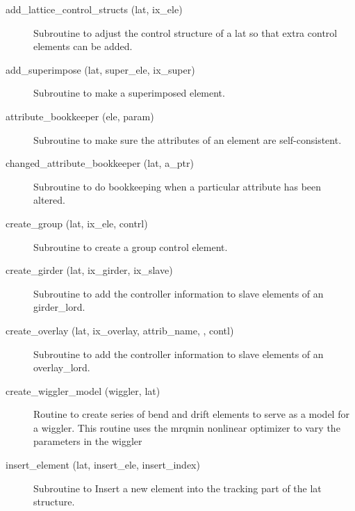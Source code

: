 \begin{description}

\label{r:add.lattice.control.structs}
\item[add_lattice_control_structs (lat, ix_ele)] \Newline 
Subroutine to adjust the control structure of a lat so that extra control
elements can be added.

\label{r:add.superimpose}
\item[add_superimpose (lat, super_ele, ix_super)] \Newline
Subroutine to make a superimposed element. 

\label{r:attribute.bookkeeper}
\item[attribute_bookkeeper (ele, param)] \Newline
Subroutine to make sure the attributes of an element are self-consistent. 

\label{r:changed.attribute.bookkeeper}
\item[changed_attribute_bookkeeper (lat, a_ptr)] \Newline 
Subroutine to do bookkeeping when a particular attribute has been altered.

\label{r:create.group}
\item[create_group (lat, ix_ele, contrl)] \Newline
Subroutine to create a group control element. 

\label{r:create.girder}
\item[create_girder (lat, ix_girder, ix_slave)] \Newline 
     Subroutine to add the controller information to slave elements of
     an girder_lord.

\label{r:create.overlay}
\item[create_overlay (lat, ix_overlay, attrib_name, , contl)] \Newline
Subroutine to add the controller information to slave elements of an 
overlay_lord. 

\label{r:create.wiggler.model}
\item[create_wiggler_model (wiggler, lat)] \Newline 
Routine to create series of bend and drift elements to serve as a model for a wiggler.
This routine uses the mrqmin nonlinear optimizer to vary the parameters in the wiggler 

\label{r:insert.element}
\item[insert_element (lat, insert_ele, insert_index)] \Newline
Subroutine to Insert a new element into the tracking part of the 
lat structure. 


\end{description}

